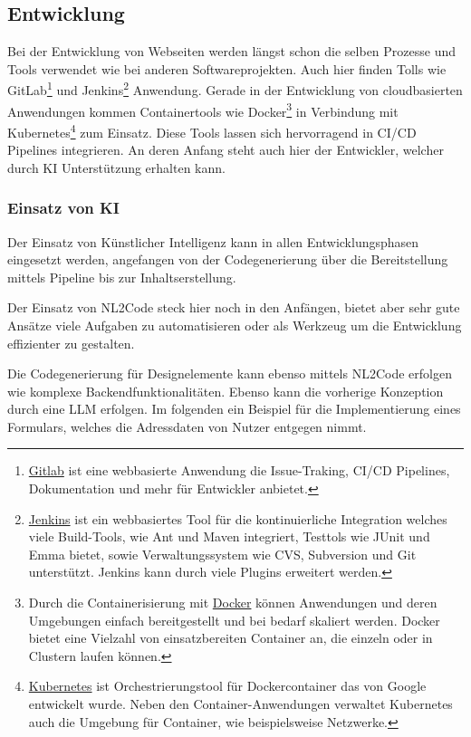 \subsection{Entwicklung}
Bei der Entwicklung von Webseiten werden längst schon die selben Prozesse und Tools verwendet wie bei anderen Softwareprojekten. Auch hier finden Tolls wie GitLab\footnote{\href{https://about.gitlab.com/}{Gitlab} ist eine webbasierte Anwendung die Issue-Traking, CI/CD Pipelines, Dokumentation und mehr für Entwickler anbietet.} und Jenkins\footnote{\href{https://www.jenkins.io/}{Jenkins} ist ein webbasiertes Tool für die kontinuierliche Integration welches viele Build-Tools, wie Ant und Maven integriert, Testtols wie JUnit und Emma bietet, sowie Verwaltungssystem wie CVS, Subversion und Git unterstützt. Jenkins kann durch viele Plugins erweitert werden.} Anwendung. Gerade in der Entwicklung von cloudbasierten Anwendungen kommen Containertools wie Docker\footnote{Durch die Containerisierung mit \href{https://www.docker.com/}{Docker} können Anwendungen und deren Umgebungen einfach bereitgestellt und bei bedarf skaliert werden. Docker bietet eine Vielzahl von einsatzbereiten Container an, die einzeln oder in Clustern laufen können.} in Verbindung mit Kubernetes\footnote{\href{https://kubernetes.io/}{Kubernetes} ist  Orchestrierungstool für Dockercontainer das von Google entwickelt wurde. Neben den Container-Anwendungen verwaltet Kubernetes auch die Umgebung für Container, wie beispielsweise Netzwerke.} zum Einsatz. Diese Tools lassen sich hervorragend in CI/CD Pipelines integrieren. An deren Anfang steht auch hier der Entwickler, welcher durch KI Unterstützung erhalten kann.


\subsubsection{Einsatz von KI}
Der Einsatz von Künstlicher Intelligenz kann in allen Entwicklungsphasen eingesetzt werden, angefangen von der Codegenerierung über die Bereitstellung mittels Pipeline bis zur Inhaltserstellung.\vspace{0.2cm}

Der Einsatz von NL2Code steck hier noch in den Anfängen, bietet aber sehr gute Ansätze viele Aufgaben zu automatisieren oder als Werkzeug um die Entwicklung effizienter zu gestalten.\vspace{0.2cm}

Die Codegenerierung für Designelemente kann ebenso mittels NL2Code erfolgen wie komplexe Backendfunktionalitäten. Ebenso kann die vorherige Konzeption durch eine LLM erfolgen. Im folgenden ein Beispiel für die Implementierung eines Formulars, welches die Adressdaten von Nutzer entgegen nimmt.\vspace{0.2cm}

